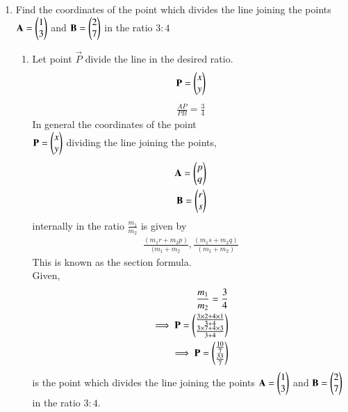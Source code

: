 \documentclass[journal,12pt,twocolumn]{IEEEtran}
\renewcommand\thesection{\arabic{section}}
\begin{document}
\begin{enumerate}[label=\thesection.\arabic*.,ref=\thesection.\theenumi]
\item Find the coordinates of the point which divides the line joining the points $\mathbf{A}=\begin{pmatrix}1\\3\end{pmatrix}$ and $\mathbf{B}=\begin{pmatrix}2\\7\end{pmatrix}$ in the ratio $3:4$
\\
\solution\begin{enumerate}
    \item Let point $\vec{P}$ divide the line in the desired ratio.
    \begin{align}
        \mathbf{P}=\begin{pmatrix}x\\y\end{pmatrix}
    \end{align}
    \begin{align}
        \frac{AP}{PB}=
        \frac{3}{4}
    \end{align}
    In general the coordinates of the point \\$\mathbf{P}=\begin{pmatrix}x\\y\end{pmatrix}$ dividing the line joining the points,
    \begin{align}
        \mathbf{A}=\begin{pmatrix}p\\q\end{pmatrix}\\
        \mathbf{B}=\begin{pmatrix}r\\s\end{pmatrix}
    \end{align}
    internally in the ratio $\frac{m_1}{m_2}$ is given by
    \begin{align}
        \frac{(m_1r+m_2p)}{(m_1+m_2},\frac{(m_1s+m_2q)}{(m_1+m_2)}
    \end{align}
    This is known as the section formula.
\\
Given,
\begin{align}
    \frac{m_1}{m_2}=\frac{3}{4}\\
    \implies \mathbf{P}=\begin{pmatrix}\frac{3\times2+4\times 1}{3+4}\\\frac{3\times 7+4\times 3}{3+4}\end{pmatrix} \\
    \implies \mathbf{P}=\begin{pmatrix}\frac{10}{7}\\\frac{33}{7}\end{pmatrix}
\end{align}
is the point which divides the line joining the points $\mathbf{A}=\begin{pmatrix}1\\3\end{pmatrix}$ and $\mathbf{B}=\begin{pmatrix}2\\7\end{pmatrix}$ in the ratio $3:4$.
\end{enumerate}
\begin{figure}[h]
\centering

\end{figure}
\end{enumerate}
\end{document}
